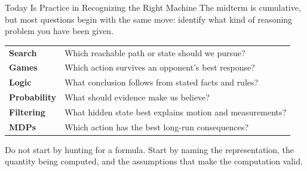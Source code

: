 \documentclass[aspectratio=169,10pt]{beamer}
\begin{document}

\makedecktitle

\begin{frame}{Today Is Practice in Recognizing the Right Machine}
  The midterm is cumulative, but most questions begin with the same move:
  identify what kind of reasoning problem you have been given.
  \begin{center}
    \renewcommand{\arraystretch}{1.45}
    \begin{tabular}{l|p{}}
      \textbf{Search} & Which reachable path or state should we pursue? \\
      \textbf{Games} & Which action survives an opponent's best response? \\
      \textbf{Logic} & What conclusion follows from stated facts and rules? \\
      \textbf{Probability} & What should evidence make us believe? \\
      \textbf{Filtering} & What hidden state best explains motion and measurements? \\
      \textbf{MDPs} & Which action has the best long-run consequences? \\
    \end{tabular}
  \end{center}
  \begin{keyidea}
    Do not start by hunting for a formula. Start by naming the representation, the quantity being computed, and the assumptions that make the computation valid.
  \end{keyidea}
\end{frame}
\end{document}
